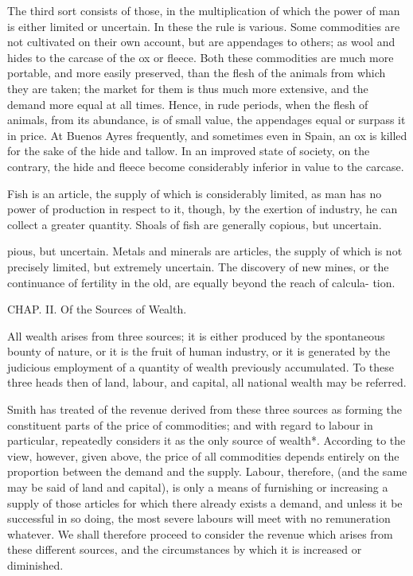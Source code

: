 \documentclass{article}
\begin{document}
The third sort consists of those, in the multiplication of which the power of man is either limited or uncertain. In these the rule is various. Some commodities are not cultivated on their own account, but are appendages to others; as wool and hides to the carcase of the ox or fleece. Both these commodities are much more portable, and more easily preserved, than the flesh of the animals from which they are taken; the market for them is thus much more extensive, and the demand more equal at all times. Hence, in rude periods, when the flesh of animals, from its abundance, is of small value, the appendages equal or surpass it in price. At Buenos Ayres frequently, and sometimes even in Spain, an ox is killed for the sake of the hide and tallow. In an improved state of society, on the contrary, the hide and fleece become considerably inferior in value to the carcase.

Fish is an article, the supply of which is considerably limited, as man has no power of production in respect to it, though, by the exertion of industry, he can collect a greater quantity. Shoals of fish are generally copious, but uncertain.

pious, but uncertain.
Metals and minerals are articles, the supply of which
is not precisely limited, but extremely uncertain. The
discovery of new mines, or the continuance of fertility
in the old, are equally beyond the reach of calcula-
tion.

CHAP. II. Of the Sources of Wealth.

All wealth arises from three sources; it is either produced by the spontaneous bounty of nature, or it is the fruit of human industry, or it is generated by the judicious employment of a quantity of wealth previously accumulated. To these three heads then of land, labour, and capital, all national wealth may be referred.

Smith has treated of the revenue derived from these three sources as forming the constituent parts of the price of commodities; and with regard to labour in particular, repeatedly considers it as the only source of wealth*. According to the view, however, given above, the price of all commodities depends entirely on the proportion between the demand and the supply. Labour, therefore, (and the same may be said of land and capital), is only a means of furnishing or increasing a supply of those articles for which there already exists a demand, and unless it be successful in so doing, the most severe labours will meet with no remuneration whatever. We shall therefore proceed to consider the revenue which arises from these different sources, and the circumstances by which it is increased or diminished.
\end{document}

